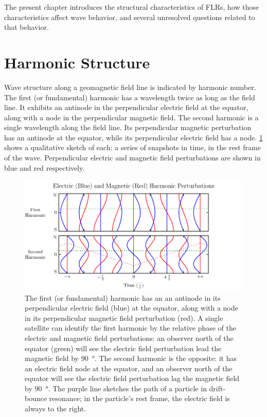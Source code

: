 The present chapter introduces the structural characteristics of FLRs, how those characteristics affect wave behavior, and several unresolved questions related to that behavior. 


\section{Harmonic Structure}
  \label{sec_harmonics}

Wave structure along a geomagnetic field line is indicated by harmonic number. The first (or fundamental) harmonic has a wavelength twice as long as the field line. It exhibits an antinode in the perpendicular electric field at the equator, along with a node in the perpendicular magnetic field. The second harmonic is a single wavelength along the field line. Its perpendicular magnetic perturbation has an antinode at the equator, while its perpendicular electric field has a node. \cref{fig_harmonics} shows a qualitative sketch of each: a series of snapshots in time, in the rest frame of the wave. Perpendicular electric and magnetic field perturbations are shown in blue and red respectively. 

\begin{figure}[!htb]
    \centering
    \includegraphics[width=\textwidth]{figures/harmonics.pdf}
    \caption[First and Second Harmonic Resonances]{
      The first (or fundamental) harmonic has an an antinode in its perpendicular electric field (blue) at the equator, along with a node in its perpendicular magnetic field perturbation (red). A single satellite can identify the first harmonic by the relative phase of the electric and magnetic field perturbations: an observer north of the equator (green) will see the electric field perturbation lead the magnetic field by \SI{90}{\degree}. The second harmonic is the opposite: it has an electric field node at the equator, and an observer north of the equator will see the electric field perturbation lag the magnetic field by \SI{90}{\degree}. The purple line sketches the path of a particle in drift-bounce resonance; in the particle's rest frame, the electric field is always to the right. 
    }
    \label{fig_harmonics}
\end{figure}

